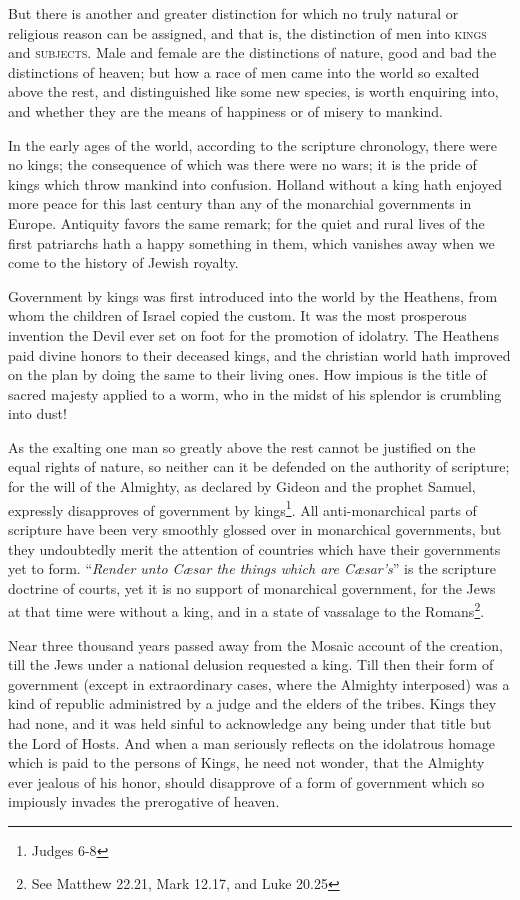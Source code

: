 \documentclass[12pt, twocolumn]{book}
\begin{document}
    But there is another and greater distinction for which no truly natural or religious reason can be assigned, and that is, the distinction of men into \textsc{kings} and \textsc{subjects}. Male and female are the distinctions of nature, good and bad the distinctions of heaven; but how a race of men came into the world so exalted above the rest, and distinguished like some new species, is worth enquiring into, and whether they are the means of happiness or of misery to mankind.

    In the early ages of the world, according to the scripture chronology, there were no kings; the consequence of which was there were no wars; it is the pride of kings which throw mankind into confusion. Holland without a king hath enjoyed more peace for this last century than any of the monarchial governments in Europe. Antiquity favors the same remark; for the quiet and rural lives of the first patriarchs hath a happy something in them, which vanishes away when we come to the history of Jewish royalty.

    Government by kings was first introduced into the world by the Heathens, from whom the children of Israel copied the custom. It was the most prosperous invention the Devil ever set on foot for the promotion of idolatry. The Heathens paid divine honors to their deceased kings, and the christian world hath improved on the plan by doing the same to their living ones. How impious is the title of sacred majesty applied to a worm, who in the midst of his splendor is crumbling into dust!

    As the exalting one man so greatly above the rest cannot be justified on the equal rights of nature, so neither can it be defended on the authority of scripture; for the will of the Almighty, as declared by Gideon and the prophet Samuel, expressly disapproves of government by kings\footnote{Judges 6-8}. All anti-monarchical parts of scripture have been very smoothly glossed over in monarchical governments, but they undoubtedly merit the attention of countries which have their governments yet to form. “\textit{Render unto Cæsar the things which are Cæsar’s}” is the scripture doctrine of courts, yet it is no support of monarchical government, for the Jews at that time were without a king, and in a state of vassalage to the Romans\footnote{See Matthew 22.21, Mark 12.17, and Luke 20.25}.

    Near three thousand years passed away from the Mosaic account of the creation, till the Jews under a national delusion requested a king. Till then their form of government (except in extraordinary cases, where the Almighty interposed) was a kind of republic administred by a judge and the elders of the tribes. Kings they had none, and it was held sinful to acknowledge any being under that title but the Lord of Hosts. And when a man seriously reflects on the idolatrous homage which is paid to the persons of Kings, he need not wonder, that the Almighty ever jealous of his honor, should disapprove of a form of government which so impiously invades the prerogative of heaven.
\end{document}
